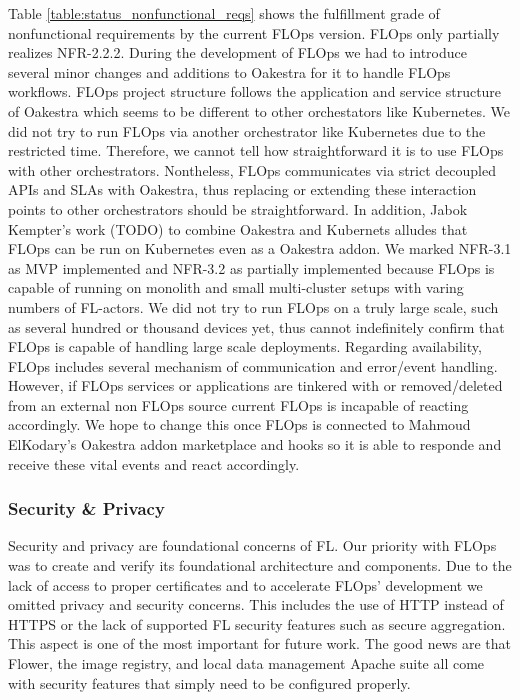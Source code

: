 

Table \ref{table:status_nonfunctional_reqs} shows the fulfillment grade of nonfunctional requirements by the current FLOps version.
FLOps only partially realizes NFR-2.2.2.
During the development of FLOps we had to introduce several minor changes and additions to Oakestra for it to handle FLOps workflows.
FLOps project structure follows the application and service structure of Oakestra which seems to be different to other orchestators like Kubernetes.
We did not try to run FLOps via another orchestrator like Kubernetes due to the restricted time.
Therefore, we cannot tell how straightforward it is to use FLOps with other orchestrators.
Nontheless, FLOps communicates via strict decoupled APIs and SLAs with Oakestra, thus replacing or extending these interaction points to other orchestrators should be straightforward.
In addition, Jabok Kempter's work (TODO) to combine Oakestra and Kubernets alludes that FLOps can be run on Kubernetes even as a Oakestra addon.
We marked NFR-3.1 as MVP implemented and NFR-3.2 as partially implemented because FLOps is capable of running on monolith and small multi-cluster setups with varing numbers of FL-actors.
We did not try to run FLOps on a truly large scale, such as several hundred or thousand devices yet, thus cannot indefinitely confirm that FLOps is capable of handling large scale deployments.
Regarding availability, FLOps includes several mechanism of communication and error/event handling.
However, if FLOps services or applications are tinkered with or removed/deleted from an external non FLOps source current FLOps is incapable of reacting accordingly.
We hope to change this once FLOps is connected to Mahmoud ElKodary's Oakestra addon marketplace and hooks so it is able to responde and receive these vital events and react accordingly.

\subsubsection{Security \& Privacy}
Security and privacy are foundational concerns of FL.
Our priority with FLOps was to create and verify its foundational architecture and components.
Due to the lack of access to proper certificates and to accelerate FLOps' development we omitted privacy and security concerns.
This includes the use of HTTP instead of HTTPS or the lack of supported FL security features such as secure aggregation.
This aspect is one of the most important for future work.
The good news are that Flower, the image registry, and local data management Apache suite all come with security features that simply need to be configured properly.

